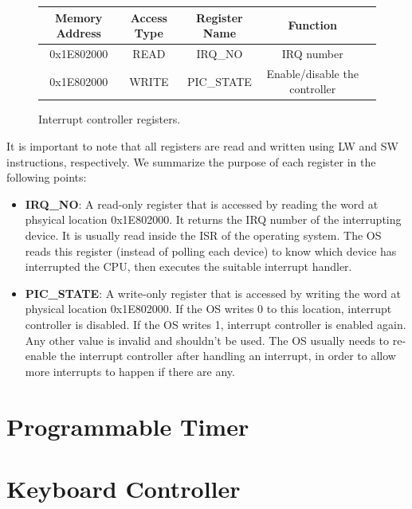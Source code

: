 \documentclass[oneside]{book}
\begin{document}
\begin{figure}[H]
\begin{center}
\begin{tabular}{|c|c|c|c|c|}

\hline \textbf{Memory Address} & \textbf{Access Type} &
       \textbf{Register Name} & \textbf{Function}  \\

\hline 0x1E802000 & READ & IRQ\_NO & IRQ number \\
\hline 0x1E802000 & WRITE & PIC\_STATE & Enable/disable the controller \\
\hline

\end{tabular}
\end{center}
\caption{Interrupt controller registers.}
\label{picregs}
\end{figure}

It is important to note that all registers are read and written using
LW and SW instructions, respectively. We summarize the purpose of each
register in the following points:

\begin{itemize}

\item \textbf{IRQ\_NO}:
A read-only register that is accessed by reading the word at phsyical
location 0x1E802000. It returns the IRQ number of the interrupting
device. It is usually read inside the ISR of the operating system. The OS
reads this register (instead of polling each device) to know which device
has interrupted the CPU, then executes the suitable interrupt handler.

\item \textbf{PIC\_STATE}:
A write-only register that is accessed by writing the word at physical
location 0x1E802000. If the OS writes 0 to this location, interrupt controller
is disabled. If the OS writes 1, interrupt controller is enabled again.
Any other value is invalid and shouldn't be used. The OS usually needs
to re-enable the interrupt controller after handling an interrupt,
in order to allow more interrupts to happen if there are any.

\end{itemize}


\section{Programmable Timer}

\section{Keyboard Controller}
\end{document}
